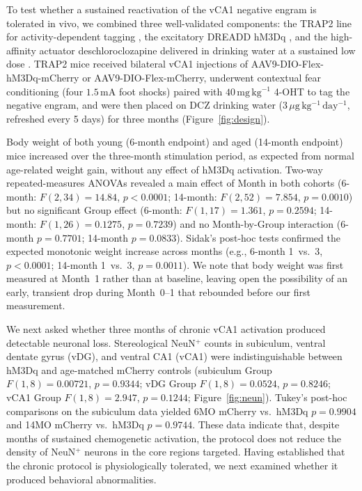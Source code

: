 \documentclass[11pt]{article}
\begin{document}
To test whether a sustained reactivation of the vCA1 negative engram is tolerated in vivo, we combined three well-validated components: the TRAP2 line for activity-dependent tagging \citep{denardo2019temporal}, the excitatory DREADD hM3Dq \citep{roth2016dreadds}, and the high-affinity actuator deschloroclozapine delivered in drinking water at a sustained low dose \citep{nagai2020dcz}. TRAP2 mice received bilateral vCA1 injections of AAV9-DIO-Flex-hM3Dq-mCherry or AAV9-DIO-Flex-mCherry, underwent contextual fear conditioning (four $1.5\,\mathrm{mA}$ foot shocks) paired with $40\,\mathrm{mg\,kg^{-1}}$ 4-OHT to tag the negative engram, and were then placed on DCZ drinking water ($3\,\mu\mathrm{g\,kg^{-1}\,day^{-1}}$, refreshed every 5 days) for three months (Figure~\ref{fig:design}).

Body weight of both young (6-month endpoint) and aged (14-month endpoint) mice increased over the three-month stimulation period, as expected from normal age-related weight gain, without any effect of hM3Dq activation. Two-way repeated-measures ANOVAs revealed a main effect of Month in both cohorts (6-month: $F(2,34)=14.84$, $p<0.0001$; 14-month: $F(2,52)=7.854$, $p=0.0010$) but no significant Group effect (6-month: $F(1,17)=1.361$, $p=0.2594$; 14-month: $F(1,26)=0.1275$, $p=0.7239$) and no Month-by-Group interaction (6-month $p=0.7701$; 14-month $p=0.0833$). Sidak's post-hoc tests confirmed the expected monotonic weight increase across months (e.g., 6-month 1~vs.~3, $p<0.0001$; 14-month 1~vs.~3, $p=0.0011$). We note that body weight was first measured at Month~1 rather than at baseline, leaving open the possibility of an early, transient drop during Month~0--1 that rebounded before our first measurement.

We next asked whether three months of chronic vCA1 activation produced detectable neuronal loss. Stereological NeuN$^{+}$ counts in subiculum, ventral dentate gyrus (vDG), and ventral CA1 (vCA1) were indistinguishable between hM3Dq and age-matched mCherry controls (subiculum Group $F(1,8)=0.00721$, $p=0.9344$; vDG Group $F(1,8)=0.0524$, $p=0.8246$; vCA1 Group $F(1,8)=2.947$, $p=0.1244$; Figure~\ref{fig:neun}). Tukey's post-hoc comparisons on the subiculum data yielded 6MO mCherry vs.~hM3Dq $p=0.9904$ and 14MO mCherry vs.~hM3Dq $p=0.9744$. These data indicate that, despite months of sustained chemogenetic activation, the protocol does not reduce the density of NeuN$^{+}$ neurons in the core regions targeted. Having established that the chronic protocol is physiologically tolerated, we next examined whether it produced behavioral abnormalities.
\end{document}

